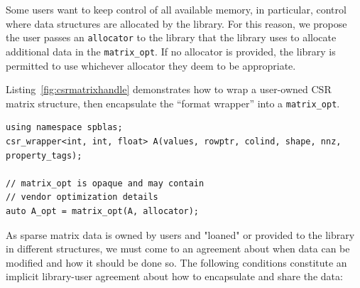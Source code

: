 \documentclass[manuscript,review]{acmart}
\begin{document}
Some users want to keep control of all available memory, in particular, control where data structures are allocated by the library. For this reason, we propose the user passes an \texttt{allocator} to the library that the library uses to allocate additional data in the \texttt{matrix\_opt}. If no allocator is provided, the library is permitted to use whichever allocator they deem to be appropriate.


Listing~\ref{fig:csrmatrixhandle} demonstrates how to wrap a user-owned CSR matrix structure, then encapsulate the ``format wrapper'' into a \texttt{matrix\_opt}. 


\begin{listing}[h]
\caption{Wrapping a CSR matrix structure composing of \texttt{values, rowptr, colind, shape, nnz} into a \texttt{matrix\_opt} with user-specified \texttt{allocator}.}
\label{fig:csrmatrixhandle}
\begin{verbatim}
using namespace spblas;
csr_wrapper<int, int, float> A(values, rowptr, colind, shape, nnz, property_tags);

// matrix_opt is opaque and may contain 
// vendor optimization details
auto A_opt = matrix_opt(A, allocator);
\end{verbatim}
\end{listing}

As sparse matrix data is owned by users and "loaned" or provided to the library in different structures, we must come to an agreement about when data can be modified and how it should be done so.  The following conditions constitute an implicit library-user agreement about how to encapsulate and share the data:
\end{document}
